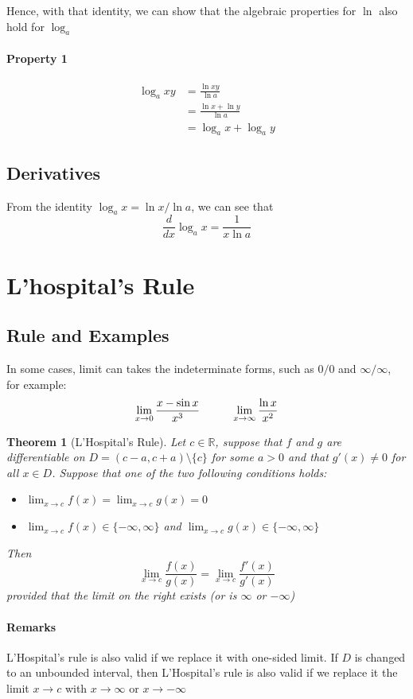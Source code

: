\documentclass[12pt]{article}
\newcommand\tab[1][1cm]{\hspace*{#1}}
\newtheorem{theorem}{Theorem}
\begin{document}
Hence, with that identity, we can show that the algebraic properties for $\ln$ also hold for $\log_a$

\paragraph{Property 1}
\begin{align*} 
    \log_a xy &= \frac{\ln xy}{\ln a} \\
    &= \frac{\ln x + \ln y}{\ln a} \\
    &= \log_a x + \log_a y 
\end{align*}

\subsection{Derivatives}
From the identity $\log_a x = \ln x / \ln a$, we can see that
\[
    \frac{d}{dx} \log_a x = \frac{1}{x \ln a}
\]
\section{L'hospital's Rule}
\subsection{Rule and Examples}
In some cases, limit can takes the indeterminate forms, such as $0/0$ and $\infty/\infty$, for example:
\[
    \lim_{x \to 0} \frac{x - \sin x}{x^3} \textrm{\tab} \lim_{x \to \infty} \frac{\ln x}{x^2} 
\]

\begin{theorem}[L'Hospital's Rule]
     Let $c \in \mathbb{R}$, suppose that $f$ and $g$ are differentiable on 
     $D = (c - a, c + a)\setminus\{c\}$ for some $a > 0 $ and that $g'(x) \neq 0$ for all $x \in D$. Suppose
     that one of the two following conditions holds:
     \begin{itemize} 
          \item  $\lim_{x \to c} f(x) = \lim_{x \to c} g(x) = 0 $
          \item $\lim_{x \to c} f(x) \in \{-\infty, \infty\}$ and $\lim_{x \to c} g(x) \in \{-\infty, \infty\}$
     \end{itemize}
     Then 
     \[
         \lim_{x \to c} \frac{f(x)}{g(x)} = \lim_{x \to c} \frac{f'(x)}{g'(x)} 
     \]
     provided that the limit on the right exists (or is $\infty$ or $-\infty$)
\end{theorem}

\paragraph{Remarks}
L'Hospital's rule is also valid if we replace it with one-sided limit. If $D$ is changed to an unbounded interval, then L'Hospital's rule is also
valid if we replace it the limit $x \to c$ with $x \to \infty$ or $x \to - \infty$
\end{document}
